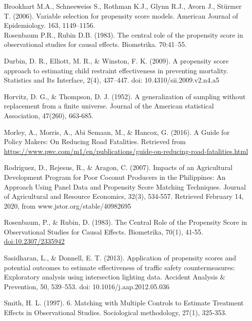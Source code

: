 \documentclass[]{article}
\begin{document}
Brookhart M.A., Schneeweiss S., Rothman K.J., Glynn R.J., Avorn J., Stürmer T. (2006). Variable selection for propensity score models. American Journal of Epidemiology. 163, 1149--1156.\\
Rosenbaum P.R., Rubin D.B. (1983). The central role of the propensity score in observational studies for causal effects. Biometrika. 70:41--55.

Durbin, D. R., Elliott, M. R., \& Winston, F. K. (2009). A propensity score approach to estimating child restraint effectiveness in preventing mortality. Statistics and Its Interface, 2(4), 437--447. doi: 10.4310/sii.2009.v2.n4.a5

Horvitz, D. G., \& Thompson, D. J. (1952). A generalization of sampling without replacement from a finite universe. Journal of the American statistical Association, 47(260), 663-685.

Morley, A., Morris, A., Abi Semaan, M., \& Hancox, G. (2016). A Guide for Policy Makers: On Reducing Road Fatalities. Retrieved from \url{https://www.pwc.com/m1/en/publications/guide-on-reducing-road-fatalities.html}

Rodriguez, D., Rejesus, R., \& Aragon, C. (2007). Impacts of an Agricultural Development Program for Poor Coconut Producers in the Philippines: An Approach Using Panel Data and Propensity Score Matching Techniques. Journal of Agricultural and Resource Economics, 32(3), 534-557. Retrieved February 14, 2020, from www.jstor.org/stable/40982695

Rosenbaum, P., \& Rubin, D. (1983). The Central Role of the Propensity Score in Observational Studies for Causal Effects. Biometrika, 70(1), 41-55. \url{doi:10.2307/2335942}

Sasidharan, L., \& Donnell, E. T. (2013). Application of propensity scores and potential outcomes to estimate effectiveness of traffic safety countermeasures: Exploratory analysis using intersection lighting data. Accident Analysis \& Prevention, 50, 539--553. doi: 10.1016/j.aap.2012.05.036

Smith, H. L. (1997). 6. Matching with Multiple Controls to Estimate Treatment Effects in Observational Studies. Sociological methodology, 27(1), 325-353.
\end{document}
